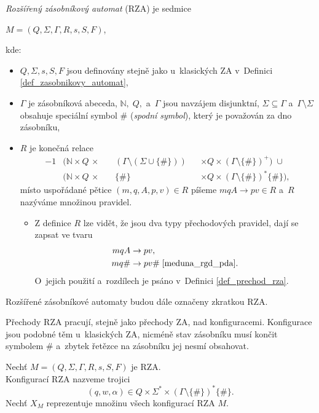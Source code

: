 \begin{definition}\label{def_rza}
    \emph{Rozšířený zásobníkový automat} (RZA) je sedmice
    \begin{center}
        $M = (Q, \Sigma, \Gamma, R, s, S, F)$,
    \end{center}
    kde:
    \begin{itemize}
        \item $Q, \Sigma, s, S, F$ jsou definovány stejně jako u~klasických ZA v~Definici \ref{def_zasobnikovy_automat},
        \item $\Gamma$ je zásobníková abeceda, $\mathbb{N},\; Q,$ a~$\Gamma$ jsou navzájem disjunktní, $\Sigma \subseteq \Gamma$ a~$\Gamma \setminus \Sigma$ obsahuje speciální symbol $\#$ (\emph{spodní symbol}), který je považován za dno zásobníku, 
        \item $R$ je konečná relace
        \begin{alignat*}{-1}
             &(\mathbb{N} \times Q \,\times \,&& (\Gamma \setminus (\Sigma \cup \{\#\})) &&\times Q \times (\Gamma \setminus \{\#\})^+) \;\cup \\
             &(\mathbb{N} \times Q \,\times \,&& \{\#\} &&\times Q \times (\Gamma \setminus \{\#\})^*\{\#\}),
        \end{alignat*}
        místo uspořádané pětice $(m, q, A, p, v) \in R$ píšeme $mqA \rightarrow pv \in R$ a~$R$ nazýváme množinou pravidel.
        \begin{itemize}[label=$\circ$]
            \item Z definice $R$ lze vidět, že jsou dva typy přechodových pravidel, dají se zapsat ve tvaru
            \begin{align*}
                mqA  &\rightarrow pv,\\
                mq\# &\rightarrow pv\# \; \cite{meduna_rgd_pda}.
            \end{align*}
            O~jejich použití a~rozdílech je psáno v~Definici \ref{def_prechod_rza}.
        \end{itemize}
    \end{itemize}
\end{definition}

\begin{convention}
    Rozšířené zásobníkové automaty budou dále označeny zkratkou RZA.
\end{convention}

Přechody RZA pracují, stejně jako přechody ZA, nad konfiguracemi.
Konfigurace jsou podobné těm u~klasických ZA, nicméně stav zásobníku musí končit symbolem $\#$ a~zbytek řetězce na zásobníku jej nesmí obsahovat. 
\begin{definition}\label{def_konfigurace_za}
    Nechť $M = (Q, \Sigma, \Gamma, R, s, S, F)$ je RZA.\\
    Konfigurací RZA nazveme trojici
    \begin{equation*}
        (q, w, \alpha) \in Q \times \Sigma^* \times (\Gamma \setminus \{\#\})^*\{\#\}.
    \end{equation*}
    Nechť $X_M$ reprezentuje množinu všech konfigurací RZA $M$.
\end{definition}

